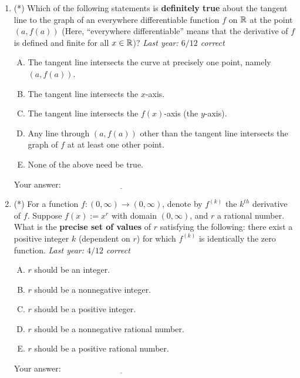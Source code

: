 \documentclass[10pt]{amsart}
\begin{document}
\begin{enumerate}
  \vspace{0.1in}
  Your answer: $\underline{\qquad\qquad\qquad\qquad\qquad\qquad\qquad}$
  \vspace{1.5in}

  {\bf PLEASE TURN OVER FOR THE THIRD AND FOURTH QUESTION.}

\newpage
\item (*) Which of the following statements is {\bf definitely true} about
  the tangent line to the graph of an everywhere differentiable
  function $f$ on $\mathbb{R}$ at the point $(a,f(a))$ (Here, ``everywhere
  differentiable'' means that the derivative of $f$ is defined and
  finite for all $x \in \mathbb{R}$)? {\em Last year: $6/12$ correct}

  \begin{enumerate}[(A)]

  \item The tangent line intersects the curve at precisely one point,
    namely $(a,f(a))$.
  \item The tangent line intersects the $x$-axis.
  \item The tangent line intersects the $f(x)$-axis (the $y$-axis).
  \item Any line through $(a,f(a))$ other than the tangent line
    intersects the graph of $f$ at at least one other point.
  \item None of the above need be true.
  \end{enumerate}

  \vspace{0.1in}
  Your answer: $\underline{\qquad\qquad\qquad\qquad\qquad\qquad\qquad}$
  \vspace{1.5in}

\item (*) For a function $f: (0,\infty) \to (0,\infty)$, denote by
  $f^{(k)}$ the $k^{th}$ derivative of $f$. Suppose $f(x) := x^r$ with
  domain $(0,\infty)$, and $r$ a rational number. What is the {\bf
  precise set of values} of $r$ satisfying the following: there exist
  a positive integer $k$ (dependent on $r$) for which $f^{(k)}$ is
  identically the zero function. {\em Last year: $4/12$ correct}

  \begin{enumerate}[(A)]
  \item $r$ should be an integer.
  \item $r$ should be a nonnegative integer.
  \item $r$ should be a positive integer.
  \item $r$ should be a nonnegative rational number.
  \item $r$ should be a positive rational number.
  \end{enumerate}

  \vspace{0.1in}
  Your answer: $\underline{\qquad\qquad\qquad\qquad\qquad\qquad\qquad}$
  \vspace{1.5in}

\end{enumerate}
\end{document}
